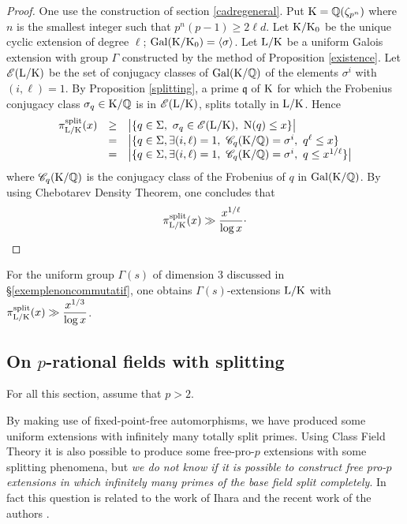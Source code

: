 \documentclass[12pt,a4paper,twoside,english]{smfart}
\def\K{{\rm K}}
\def\L{{\rm L}}
\def\Q{{\mathbb Q}}
\def\N{{\rm N}}
\def\C{{\mathcal C}}
\def\E{{\mathcal E}}
\def\q{{\mathfrak q}}
\def\Gal{{\rm Gal}}
\begin{document}
 \begin{proof} One use the construction of section \ref{cadregeneral}. Put $\K=\Q(\zeta_{p^n})$ where $n$ is the smallest integer such that 
 $p^n(p-1)\geq 2\ell d$.
 Let $\K/\K_0$ be the unique cyclic extension of degree $\ell$; $\Gal(\K/\K_0)=\langle \sigma \rangle$.   Let $\L/\K$ be a uniform Galois extension with group $\Gamma$ constructed by the method of Proposition \ref{existence}.
 Let $\E(\L/\K)$ be the set of conjugacy classes of  $\Gal(\K/\Q)$ of the elements $\sigma^i$ with  $(i,\ell)=1$.  
 By Proposition  \ref{splitting}, a prime $\q$ of $\K$ for which the Frobenius conjugacy class $\sigma_\q \in \K/\Q$ is in $\E(\L/\K)$, splits totally in $\L/\K$. Hence
 $$
\begin{array}{rcl} \pi_{\L/\K}^{\mathrm{split}}(x) & \geq &\big|\{ \q \in \Sigma, \  \sigma_\q \in \E(\L/\K), \ \N(\q) \leq x\}\big| \\ 
&=& \big|\{ \q \in \Sigma, \exists (i,\ell)=1, \ \C_q(\K/\Q) = \sigma^i, \  q^\ell \leq x\} \\
&=& \big| \{ \q \in \Sigma, \exists (i,\ell)=1, \ \C_q(\K/\Q) = \sigma^i, \  q \leq x^{1/\ell}\}\big|
\end{array}$$
where $\C_q(\K/\Q)$ is the conjugacy class of the Frobenius of $q$ in $\Gal(\K/\Q)$.
By using Chebotarev Density Theorem, one concludes that 
$$\pi_{\L/\K}^{\mathrm{split}}(x) \gg  \frac{x^{1/\ell}}{\log x} \cdot$$
 \end{proof}
 
 
\begin{exem}
For the uniform group $\Gamma(s)$ of dimension 3 discussed in \S \ref{exemplenoncommutatif}, one obtains $\Gamma(s)$-extensions $\L/\K$ with
$\displaystyle{\pi_{\L/\K}^{\mathrm{split}}(x) \gg  \frac{x^{1/3}}{\log x} }$.
\end{exem}

\subsection{On $p$-rational fields with splitting}\label{splitting-section}
For all this section, assume that $p>2$.

By making use of fixed-point-free automorphisms, we have produced some uniform extensions with infinitely many totally split primes.  
Using Class Field Theory it is also possible to produce some free-pro-$p$ extensions with some splitting phenomena, but \emph{we do not know if it is possible to construct free pro-$p$ extensions in which infinitely many primes of the base field split completely}. 
In fact this question is related to the work of Ihara \cite{Ihara} and the recent work of the authors \cite{Hajir-Maire}.
\end{document}
